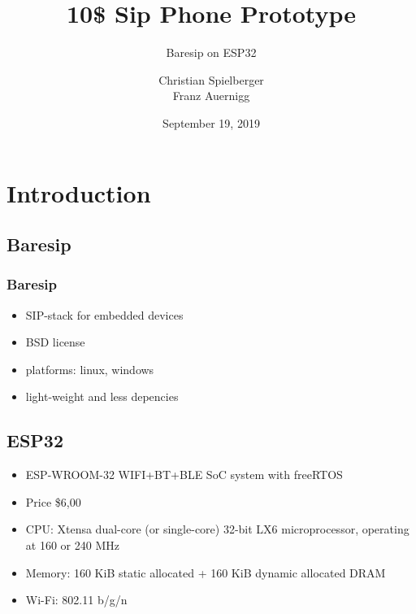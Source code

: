 \documentclass{beamer}
\title{10\$ Sip Phone Prototype}
\subtitle{Baresip on ESP32}
\author{Christian Spielberger\\Franz Auernigg}
\date{September 19, 2019}
\begin{document}

\maketitle

\begin{frame} %
	\footnotesize
	\tableofcontents
\end{frame}

\section{Introduction}

\subsection{Baresip}
\begin{frame}
\frametitle{Baresip}
\begin{itemize}
\item SIP-stack for embedded devices
  
\item BSD license

\item platforms: linux, windows

\item light-weight and less depencies
\end{itemize}
\end{frame}


 \subsection{ESP32}

\begin{frame}
\begin{itemize}
 \item ESP-WROOM-32 WIFI+BT+BLE SoC system with freeRTOS
 \item Price \$6,00
 \item CPU: Xtensa dual-core (or single-core) 32-bit LX6 microprocessor, 
   operating at 160 or 240 MHz
 \item Memory: 160 KiB static allocated + 160 KiB dynamic allocated DRAM
 \item Wi-Fi: 802.11 b/g/n
\end{itemize}
\end{frame}
\end{document}
